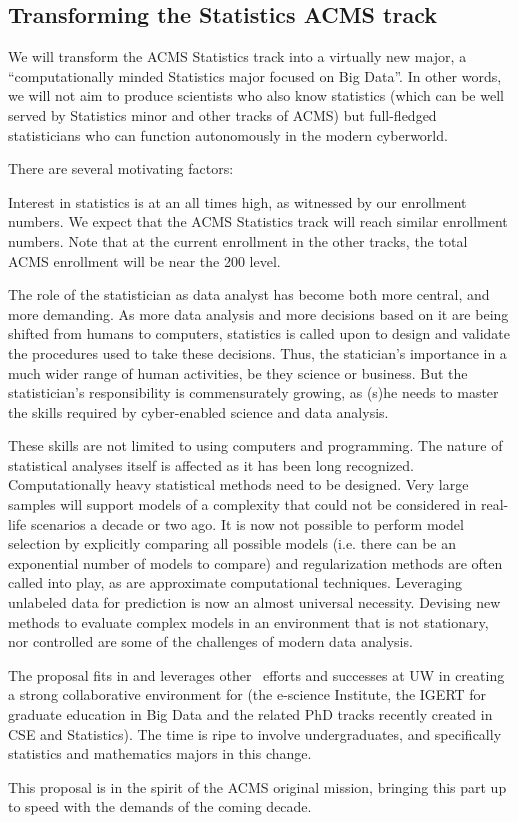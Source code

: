 \subsection{Transforming the Statistics  ACMS track}
We will transform the ACMS Statistics track into a virtually new
major, a ``computationally minded Statistics major focused on Big Data''. 
In other words, we will not aim to produce scientists who also know statistics (which
can be well served by Statistics minor and other tracks of ACMS) but
full-fledged statisticians who can function autonomously in the modern
cyberworld.

There are several motivating factors:
\bit
\item Interest in statistics is at an all times high, as witnessed by
  our enrollment numbers. We expect that the ACMS Statistics track
  will reach similar enrollment numbers. Note that at the current
  enrollment in the other tracks, the total ACMS enrollment will be
  near the 200 level.

\item The role of
  the statistician as data analyst has become both more central, and
  more demanding. As more data analysis and more decisions based on it
  are being shifted from humans to computers, statistics is called
  upon to design and validate the procedures used to take these
  decisions. Thus, the statician's importance in a much wider range of
  human activities, be they science or business. But the
  statistician's responsibility is commensurately growing, as (s)he needs
  to master the skills required by cyber-enabled science and data
  analysis.
\item These skills are not limited to using computers and
  programming. The nature of statistical analyses itself is
  affected  as it has been long
  recognized. Computationally heavy statistical methods need to be
  designed. Very large samples will support models of a complexity
  that could not be considered in real-life scenarios a decade or two
  ago. It is now not possible to perform model selection by explicitly
  comparing all possible models (i.e. there can be an exponential
  number of models to compare) and regularization methods are often
  called into play, as are approximate computational
  techniques. Leveraging unlabeled data for prediction is now an
  almost universal necessity. Devising new methods to evaluate complex
  models in an environment that is not stationary, nor controlled are
  some of the challenges of modern data analysis.
\item The proposal fits in and leverages other \cdse\ efforts and successes at UW in creating a strong collaborative environment for (the e-science Institute, the IGERT for graduate education in Big Data and the related PhD tracks recently created in CSE and Statistics). The time is ripe to involve undergraduates, and specifically statistics and mathematics majors in this change.
\item This proposal is in the spirit of the ACMS original mission,
  bringing this part up to speed with the demands of the coming decade.
\eit

